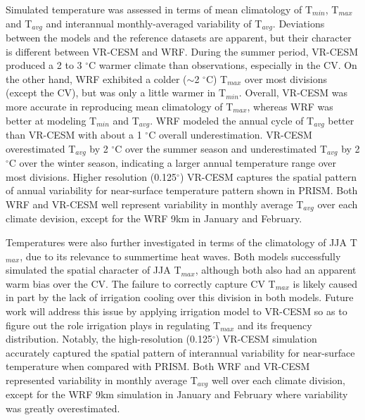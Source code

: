 \documentclass[draft,ms]{agutex}   %
\begin{document}
\begin{article}
Simulated temperature was assessed in terms of mean climatology of T$_{min}$, T$_{max}$ and T$_{avg}$ and interannual monthly-averaged variability of T$_{avg}$.  Deviations between the models and the reference datasets are apparent, but their character is different between VR-CESM and WRF. During the summer period, VR-CESM produced a 2 to 3 $^\circ$C warmer climate than observations, especially in the CV. On the other hand, WRF exhibited a colder ($\sim$2 $^\circ$C) T$_{max}$ over most divisions (except the CV), but was only a little warmer in T$_{min}$. Overall, VR-CESM was more accurate in reproducing mean climatology of T$_{max}$, whereas WRF was better at modeling T$_{min}$ and T$_{avg}$. WRF modeled the annual cycle of T$_{avg}$ better than VR-CESM with about a 1 $^\circ$C overall underestimation. VR-CESM overestimated T$_{avg}$ by 2 $^\circ$C over the summer season and underestimated T$_{avg}$ by 2 $^\circ$C over the winter season, indicating a larger annual temperature range over most divisions. Higher resolution (0.125$^\circ$) VR-CESM captures the spatial pattern of annual variability for near-surface temperature pattern shown in PRISM. Both WRF and VR-CESM well represent variability in monthly average T$_{avg}$ over each climate devision, except for the WRF 9km in January and February.


Temperatures were also further investigated in terms of the climatology of JJA T$_{max}$, due to its relevance to summertime heat waves.  Both models successfully simulated the spatial character of JJA T$_{max}$, although both also had an apparent warm bias over the CV.  The failure to correctly capture CV T$_{max}$ is likely caused in part by the lack of irrigation cooling over this division in both models. Future work will address this issue by applying irrigation model to VR-CESM so as to figure out the role irrigation plays in regulating T$_{max}$ and its frequency distribution. Notably, the high-resolution (0.125$^\circ$) VR-CESM simulation accurately captured the spatial pattern of interannual variability for near-surface temperature when compared with PRISM. Both WRF and VR-CESM represented variability in monthly average T$_{avg}$ well over each climate division, except for the WRF 9km simulation in January and February where variability was greatly overestimated.



\end{article}
\end{document}
